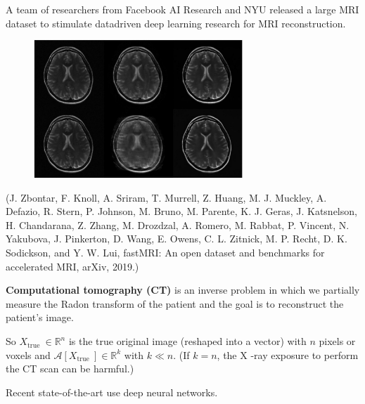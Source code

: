 \begin{definition}
    A team of researchers from Facebook AI Research and NYU released a large MRI dataset to stimulate datadriven deep learning research for MRI reconstruction.

    \begin{figure}[H]
        \centering
        \includegraphics[width=0.7\textwidth]{.././assets/8.26.jpg}
    \end{figure}

    (J. Zbontar, F. Knoll, A. Sriram, T. Murrell, Z. Huang, M. J. Muckley, A. Defazio, R. Stern, P. Johnson, M. Bruno, M. Parente, K. J. Geras, J. Katsnelson, H. Chandarana, Z. Zhang, M. Drozdzal, A. Romero, M. Rabbat, P. Vincent, N. Yakubova, J. Pinkerton, D. Wang, E. Owens, C. L. Zitnick, M. P. Recht, D. K. Sodickson, and Y. W. Lui, fastMRI: An open dataset and benchmarks for accelerated MRI, arXiv, 2019.)
\end{definition}

\begin{definition}
    \textbf{Computational tomography (CT)} is an inverse problem in which we partially measure the Radon transform of the patient and the goal is to reconstruct the patient's image.

    So $X_{\text {true }} \in \mathbb{R}^{n}$ is the true original image (reshaped into a vector) with $n$ pixels or voxels and $\mathcal{A}\left[X_{\text {true }}\right] \in \mathbb{R}^{k}$ with $k \ll n$. (If $k=n$, the X -ray exposure to perform the CT scan can be harmful.)

    Recent state-of-the-art use deep neural networks.
\end{definition}

